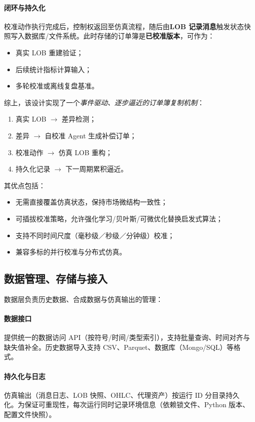 \documentclass{mancls}
\begin{document}
\paragraph{闭环与持久化}
校准动作执行完成后，控制权返回至仿真流程，随后由\textbf{LOB 记录消息}触发状态快照写入数据库/文件系统。此时存储的订单簿是\textbf{已校准版本}，可作为：
\begin{itemize}
  \item 真实 LOB 重建验证；
  \item 后续统计指标计算输入；
  \item 多轮校准或离线复盘基准。
\end{itemize}


综上，该设计实现了一个\emph{事件驱动、逐步逼近的订单簿复制机制}：
\begin{enumerate}
  \item 真实 LOB $\rightarrow$ 差异检测；
  \item 差异 $\rightarrow$ 自校准 Agent 生成补偿订单；
  \item 校准动作 $\rightarrow$ 仿真 LOB 重构；
  \item 持久化记录 $\rightarrow$ 下一周期累积逼近。
\end{enumerate}
其优点包括：
\begin{itemize}
  \item 无需直接覆盖仿真状态，保持市场微结构一致性；
  \item 可插拔校准策略，允许强化学习/贝叶斯/可微优化替换启发式算法；
  \item 支持不同时间尺度（毫秒级／秒级／分钟级）校准；
  \item 兼容多标的并行校准与分布式仿真。
\end{itemize}




\subsection{数据管理、存储与接入}
数据层负责历史数据、合成数据与仿真输出的管理：

\paragraph{数据接口}
提供统一的数据访问 API（按符号/时间/类型索引），支持批量查询、时间对齐与缺失值补全。历史数据导入支持 CSV、Parquet、数据库（Mongo/SQL）等格式。

\paragraph{持久化与日志}
仿真输出（消息日志、LOB 快照、OHLC、代理资产）按运行 ID 分目录持久化。为保证可重现性，每次运行同时记录环境信息（依赖锁文件、Python 版本、配置文件快照）。
\end{document}
